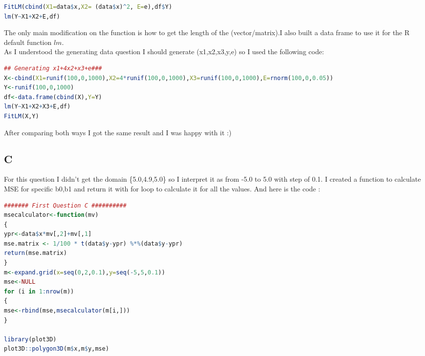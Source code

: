 \documentclass{article}
\begin{document}
\begin{multicols*}{2}
\begin{flushleft}
\begin{lstlisting}[language=R]
FitLM(cbind(X1=data$x,X2= (data$x)^2, E=e),df$Y)
lm(Y~X1+X2+E,df)
\end{lstlisting}
The only main modification on the function is how to get the length of the (vector/matrix).I also built a data frame to use it for the R default function \(lm\).\\
As I understood the generating data question I should generate (x1,x2,x3,y,e) so I used the following code:
\begin{lstlisting}[language=R]
## Generating x1+4x2+x3+e###
X<-cbind(X1=runif(100,0,1000),X2=4*runif(100,0,1000),X3=runif(100,0,1000),E=rnorm(100,0,0.05))
Y<-runif(100,0,1000)
df<-data.frame(cbind(X),Y=Y)
lm(Y~X1+X2+X3+E,df)
FitLM(X,Y)
\end{lstlisting}
After comparing both ways I got the same result and I was happy with it :) 
{\centering\subsection*{C}}
For this question  I didn't get the domain \{5.0,4.9,5.0\} so I interpret it as from -5.0 to 5.0 with step of 0.1. I created a function to calculate MSE for specific b0,b1 and return it with for loop to calculate it for all the values. And here is the code : 
\begin{lstlisting}[language=R]
####### First Question C ##########
msecalculator<-function(mv)
{
ypr<-data$x*mv[,2]+mv[,1]
mse.matrix <- 1/100 * t(data$y-ypr) %*%(data$y-ypr)
return(mse.matrix)
}
m<-expand.grid(x=seq(0,2,0.1),y=seq(-5,5,0.1))
mse<-NULL
for (i in 1:nrow(m))
{
mse<-rbind(mse,msecalculator(m[i,]))
}

library(plot3D)
plot3D::polygon3D(m$x,m$y,mse)


\end{lstlisting}
\end{flushleft}
\end{multicols*}
\end{document}
